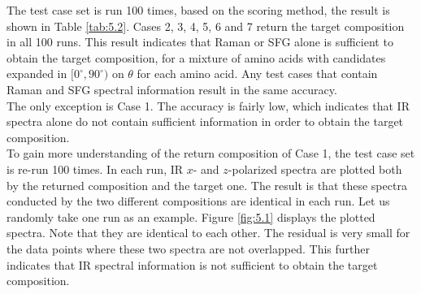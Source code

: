 
The test case set is run 100 times, based on the scoring method, the result is shown in 
Table \ref{tab:5.2}. Cases 2, 3, 4, 5, 6 and 7 return the target composition in all 100 runs. This result indicates that Raman or SFG alone is sufficient to obtain the target composition, for a mixture of amino acids with candidates expanded in $[0^{\circ}, 90^{\circ})$ on $\theta$ for each amino acid. Any test cases that contain Raman and SFG spectral information result in the same accuracy. \\

The only exception is Case 1. The accuracy is fairly low, which indicates that IR spectra alone do not contain sufficient information in order to obtain the target composition. \\

To gain more understanding of the return composition of Case 1, the test case set is re-run 100 times. In each run, IR $x$- and $z$-polarized spectra are plotted both by the returned composition and the target one. The result is that these spectra conducted by the two different compositions are identical in each run. Let us randomly take one run as an example. Figure \ref{fig:5.1} displays the plotted spectra. Note that they are identical to each other. The residual is very small for the data points where these two spectra are not overlapped. This further indicates that IR spectral information is not sufficient to obtain the target composition.\\


